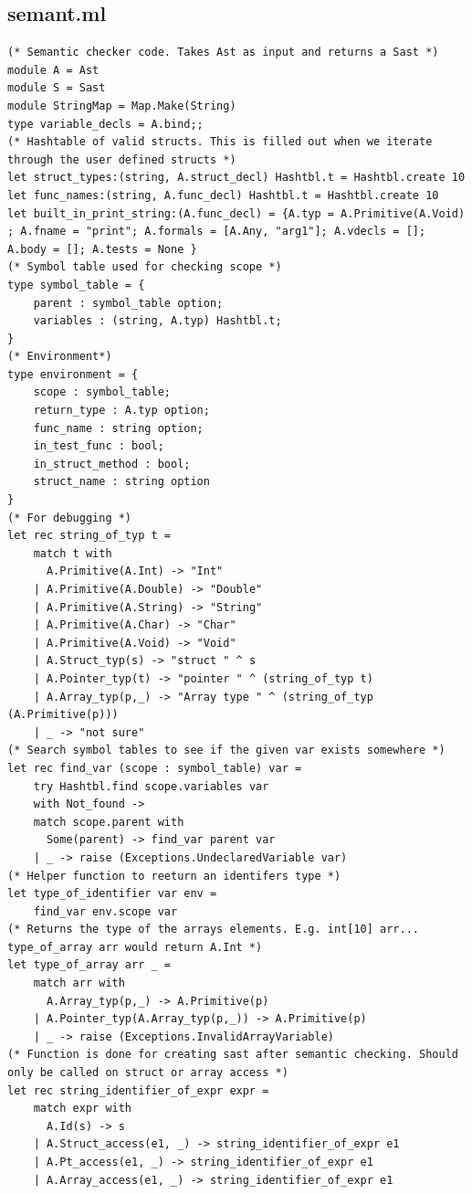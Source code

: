\documentclass{article}
\begin{document}
\subsection{semant.ml}
\begin{lstlisting}
(* Semantic checker code. Takes Ast as input and returns a Sast *)
module A = Ast
module S = Sast
module StringMap = Map.Make(String)
type variable_decls = A.bind;;
(* Hashtable of valid structs. This is filled out when we iterate through the user defined structs *)
let struct_types:(string, A.struct_decl) Hashtbl.t = Hashtbl.create 10
let func_names:(string, A.func_decl) Hashtbl.t = Hashtbl.create 10
let built_in_print_string:(A.func_decl) = {A.typ = A.Primitive(A.Void) ; A.fname = "print"; A.formals = [A.Any, "arg1"]; A.vdecls = []; A.body = []; A.tests = None }
(* Symbol table used for checking scope *)
type symbol_table = {
	parent : symbol_table option;
	variables : (string, A.typ) Hashtbl.t;
}
(* Environment*)
type environment = {
	scope : symbol_table;
	return_type : A.typ option;
	func_name : string option;
	in_test_func : bool;
	in_struct_method : bool;
	struct_name : string option
}
(* For debugging *)
let rec string_of_typ t =
	match t with
	  A.Primitive(A.Int) -> "Int"
	| A.Primitive(A.Double) -> "Double"
	| A.Primitive(A.String) -> "String"
	| A.Primitive(A.Char) -> "Char"
	| A.Primitive(A.Void) -> "Void"
	| A.Struct_typ(s) -> "struct " ^ s
	| A.Pointer_typ(t) -> "pointer " ^ (string_of_typ t)
	| A.Array_typ(p,_) -> "Array type " ^ (string_of_typ (A.Primitive(p)))
	| _ -> "not sure"
(* Search symbol tables to see if the given var exists somewhere *)
let rec find_var (scope : symbol_table) var =
	try Hashtbl.find scope.variables var
	with Not_found ->
	match scope.parent with
	  Some(parent) -> find_var parent var
	| _ -> raise (Exceptions.UndeclaredVariable var)	
(* Helper function to reeturn an identifers type *)
let type_of_identifier var env = 
	find_var env.scope var
(* Returns the type of the arrays elements. E.g. int[10] arr... type_of_array arr would return A.Int *)
let type_of_array arr _ =
	match arr with
	  A.Array_typ(p,_) -> A.Primitive(p)
	| A.Pointer_typ(A.Array_typ(p,_)) -> A.Primitive(p)
	| _ -> raise (Exceptions.InvalidArrayVariable)
(* Function is done for creating sast after semantic checking. Should only be called on struct or array access *)
let rec string_identifier_of_expr expr = 
	match expr with
	  A.Id(s) -> s
	| A.Struct_access(e1, _) -> string_identifier_of_expr e1 
	| A.Pt_access(e1, _) -> string_identifier_of_expr e1 
	| A.Array_access(e1, _) -> string_identifier_of_expr e1

\end{lstlisting}
\end{document}
